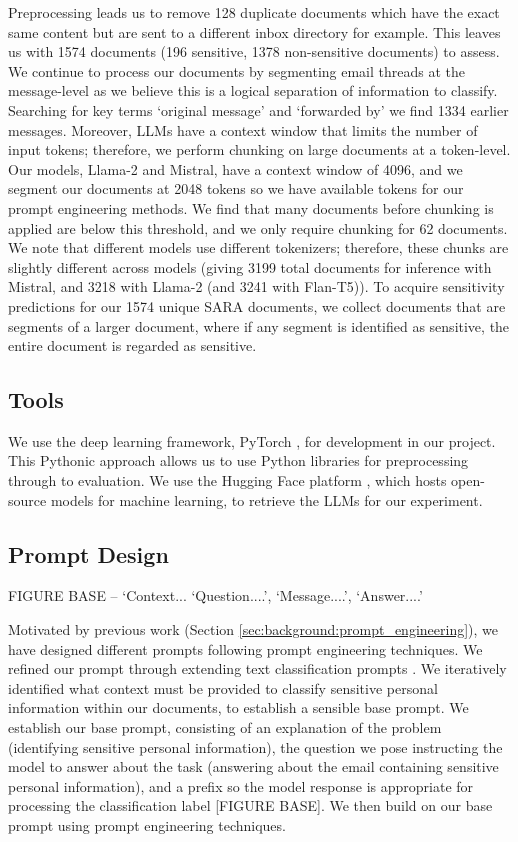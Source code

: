 Preprocessing leads us to remove 128 duplicate documents which have the exact same content but are sent to a different inbox directory for example. This leaves us with 1574 documents (196 sensitive, 1378 non-sensitive documents) to assess. We continue to process our documents by segmenting email threads at the message-level as we believe this is a logical separation of information to classify. Searching for key terms ‘original message’ and ‘forwarded by’ we find 1334 earlier messages. Moreover, LLMs have a context window that limits the number of input tokens; therefore, we perform chunking on large documents at a token-level. Our models, Llama-2 and Mistral, have a context window of 4096, and we segment our documents at 2048 tokens so we have available tokens for our prompt engineering methods. We find that many documents before chunking is applied are below this threshold, and we only require chunking for 62 documents. We note that different models use different tokenizers; therefore, these chunks are slightly different across models (giving 3199 total documents for inference with Mistral, and 3218 with Llama-2 (and 3241 with Flan-T5)). To acquire sensitivity predictions for our 1574 unique SARA documents, we collect documents that are segments of a larger document, where if any segment is identified as sensitive, the entire document is regarded as sensitive.

\subsection{Tools}
We use the deep learning framework, PyTorch \cite{paszke2019pytorch}, for development in our project. This Pythonic approach allows us to use Python libraries for preprocessing through to evaluation. We use the Hugging Face platform \cite{wolf-etal-2020-transformers}, which hosts open-source models for machine learning, to retrieve the LLMs for our experiment.

\subsection{Prompt Design}
FIGURE BASE – ‘Context... ‘Question....’, ‘Message....’, ‘Answer....’

Motivated by previous work (Section \ref{sec:background:prompt_engineering}), we have designed different prompts following prompt engineering techniques. We refined our prompt through extending text classification prompts \cite{kocon2023chatgpt}. We iteratively identified what context must be provided to classify sensitive personal information within our documents, to establish a sensible base prompt. We establish our base prompt, consisting of an explanation of the problem (identifying sensitive personal information), the question we pose instructing the model to answer about the task (answering about the email containing sensitive personal information), and a prefix so the model response is appropriate for processing the classification label [FIGURE BASE]. We then build on our base prompt using prompt engineering techniques.

